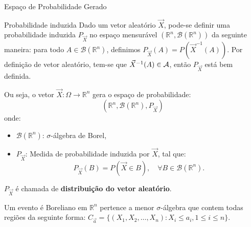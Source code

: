 \begin{frame}{Espaço de Probabilidade Gerado}

\begin{block}{Probabilidade induzida}	
	Dado um vetor aleatório $\vec{X}$, pode-se definir uma probabilidade
	induzida $P_{\vec{X}}$ no espaço mensurável $(\mathbb{R}^n, \mathcal{B}(\mathbb{R}^n))$ da
	seguinte maneira: para todo $A\in  \mathcal{B}(\mathbb{R}^n)$, definimos
	$P_{\vec{X}}(A)=P(\vec{X}^{-1}(A))$. Por definição de vetor
	aleatório, tem-se que $\vec{X}^{-1}(A)\in {\cal A}$, então $P_{\vec{X}}$
	está bem definida.

Ou seja, o vetor $\Vec{X}: \Omega \rightarrow \mathbb{R}^n$ gera o espaço de probabilidade:
	\[
	(\mathbb{R}^n, \mathcal{B}(\mathbb{R}^n), P_{\Vec{X}})
	\]
	onde:
	\begin{itemize}
		\item $\mathcal{B}(\mathbb{R}^n)$: $\sigma$-álgebra de Borel,
		\item $P_{\Vec{X}}$: Medida de probabilidade induzida por $\Vec{X}$, tal que:
		\[
		P_{\Vec{X}}(B) = P(\Vec{X} \in B), \quad \forall B \in \mathcal{B}(\mathbb{R}^n).
		\]
	\end{itemize}

\end{block}	
	$P_{\Vec{X}}$ é chamada de \textbf{distribuição do vetor aleatório}.

\medskip
Um evento é Boreliano em $\mathbb{R}^n$ pertence a menor
$\sigma$-álgebra que contem todas regiões da seguinte forma:
$C_{\vec{a}}=\{(X_1,X_2,\ldots,X_n):X_i\leq a_i, 1\leq i\leq n\}$.	
\end{frame}







